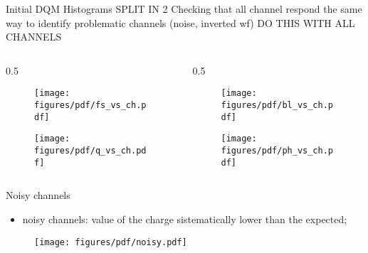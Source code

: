 \documentclass{beamer}[10pt]
\begin{document}
\begin{frame}{Initial DQM Histograms}
SPLIT IN 2
Checking that all channel respond the same way to identify problematic channels (noise, inverted wf) DO THIS WITH ALL CHANNELS
\\
\vspace{-3mm}
\begin{columns}
\begin{column}{0.5\framewidth}
\begin{figure}[H]
   \centering
   \texttt{[image: figures/pdf/fs\_vs\_ch.pdf]}
   \label{fig:wffytl}
 \end{figure}
\vspace{-8mm}
\begin{figure}[H]
   \centering
   \texttt{[image: figures/pdf/q\_vs\_ch.pdf]}
   \label{fig:wffytl}
 \end{figure}
\end{column}
\begin{column}{0.5\framewidth}
\begin{figure}[H]
   \centering
   \texttt{[image: figures/pdf/bl\_vs\_ch.pdf]}
   \label{fig:wffytl}
 \end{figure}
\vspace{-8mm}
\begin{figure}[H]
   \centering
   \texttt{[image: figures/pdf/ph\_vs\_ch.pdf]}
   \label{fig:wffytl}
 \end{figure}
\end{column}
\end{columns}
\end{frame}

\begin{frame}{Noisy channels}
\begin{itemize}
\item noisy channels: value of the charge sistematically lower than the expected;

\end{itemize}
\begin{figure}[H]
   \centering
   \texttt{[image: figures/pdf/noisy.pdf]}
   \label{fig:wffytl}
 \end{figure}
\end{frame}
\end{document}
